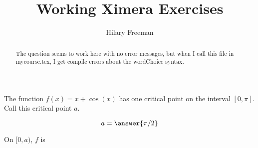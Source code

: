 \documentclass[handout]{ximera}
\title{Working Ximera Exercises}
\author{Hilary Freeman}
\begin{document}
\begin{abstract}
  The question seems to work here with no error messages, but when I call this file in mycourse.tex, I get compile errors about the wordChoice syntax.
\end{abstract}
\maketitle



\begin{exercise}
The function $f(x) =x+\cos(x)$ has one critical point on the interval $[0,\pi]$. Call this critical point $a$.

$$
a = \answer{\pi/2}
$$

On $[0,a)$, $f$ is 



\end{exercise}
\end{document}
